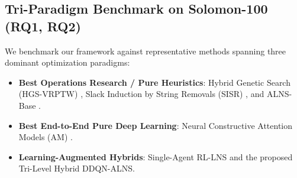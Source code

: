 \documentclass{ieeeaccess}
\begin{document}
\subsection{Tri-Paradigm Benchmark on Solomon-100 (RQ1, RQ2)}
\label{sec:solomon_results}

We benchmark our framework against representative methods spanning three dominant optimization paradigms:
\begin{itemize}
    \item \textbf{Best Operations Research / Pure Heuristics}: Hybrid Genetic Search (HGS-VRPTW) \cite{vidal2013hybrid}, Slack Induction by String Removals (SISR) \cite{christiaens2020slack}, and ALNS-Base \cite{pisinger2007general}.
    \item \textbf{Best End-to-End Pure Deep Learning}: Neural Constructive Attention Models (AM) \cite{kool2019attention,lin2021neural}.
    \item \textbf{Learning-Augmented Hybrids}: Single-Agent RL-LNS \cite{lu2020learning,son2023learning} and the proposed Tri-Level Hybrid DDQN-ALNS.
\end{itemize}
\end{document}
